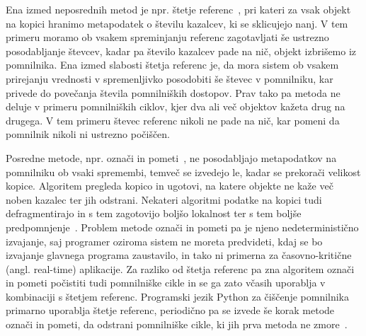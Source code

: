 Ena izmed neposrednih metod je npr. štetje referenc~\cite{collins1960method}, pri kateri za vsak objekt na kopici hranimo metapodatek o številu kazalcev, ki se sklicujejo nanj. V tem primeru moramo ob vsakem spreminjanju referenc zagotavljati še ustrezno posodabljanje števcev, kadar pa število kazalcev pade na nič, objekt izbrišemo iz pomnilnika. Ena izmed slabosti štetja referenc je, da mora sistem ob vsakem prirejanju vrednosti v spremenljivko posodobiti še števec v pomnilniku, kar privede do povečanja števila pomnilniških dostopov. Prav tako pa metoda ne deluje v primeru pomnilniških ciklov, kjer dva ali več objektov kažeta drug na drugega. V tem primeru števec referenc nikoli ne pade na nič, kar pomeni da pomnilnik nikoli ni ustrezno počiščen.

Posredne metode, npr. označi in pometi~\cite{mccarthy1960recursive}, ne posodabljajo metapodatkov na pomnilniku ob vsaki spremembi, temveč se izvedejo le, kadar se prekorači velikost kopice. Algoritem pregleda kopico in ugotovi, na katere objekte ne kaže več noben kazalec ter jih odstrani. Nekateri algoritmi podatke na kopici tudi defragmentirajo in s tem zagotovijo boljšo lokalnost ter s tem boljše predpomnjenje~\cite{fenichel1969lisp}. Problem metode označi in pometi pa je njeno nedeterministično izvajanje, saj programer oziroma sistem ne moreta predvideti, kdaj se bo izvajanje glavnega programa zaustavilo, in tako ni primerna za časovno-kritične (angl. real-time) aplikacije. Za razliko od štetja referenc pa zna algoritem označi in pometi počistiti tudi pomnilniške cikle in se ga zato včasih uporablja v kombinaciji s štetjem referenc. Programski jezik Python za čiščenje pomnilnika primarno uporablja štetje referenc, periodično pa se izvede še korak metode označi in pometi, da odstrani pomnilniške cikle, ki jih prva metoda ne zmore~\cite{van2007python}.